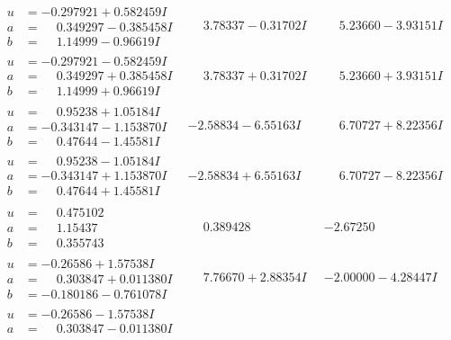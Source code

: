 \documentclass[1p]{elsarticle_modified}
\theoremstyle{definition}
\begin{document}
$$\begin{array}{c|c|c}
\begin{aligned}
u &= -0.297921 + 0.582459 I \\
a &= \phantom{-}0.349297 - 0.385458 I \\
b &= \phantom{-}1.14999 - 0.96619 I\end{aligned}
 & \phantom{-}3.78337 - 0.31702 I & \phantom{-}5.23660 - 3.93151 I \\ \hline\begin{aligned}
u &= -0.297921 - 0.582459 I \\
a &= \phantom{-}0.349297 + 0.385458 I \\
b &= \phantom{-}1.14999 + 0.96619 I\end{aligned}
 & \phantom{-}3.78337 + 0.31702 I & \phantom{-}5.23660 + 3.93151 I \\ \hline\begin{aligned}
u &= \phantom{-}0.95238 + 1.05184 I \\
a &= -0.343147 - 1.153870 I \\
b &= \phantom{-}0.47644 - 1.45581 I\end{aligned}
 & -2.58834 - 6.55163 I & \phantom{-}6.70727 + 8.22356 I \\ \hline\begin{aligned}
u &= \phantom{-}0.95238 - 1.05184 I \\
a &= -0.343147 + 1.153870 I \\
b &= \phantom{-}0.47644 + 1.45581 I\end{aligned}
 & -2.58834 + 6.55163 I & \phantom{-}6.70727 - 8.22356 I \\ \hline\begin{aligned}
u &= \phantom{-}0.475102\phantom{ +0.000000I} \\
a &= \phantom{-}1.15437\phantom{ +0.000000I} \\
b &= \phantom{-}0.355743\phantom{ +0.000000I}\end{aligned}
 & \phantom{-}0.389428\phantom{ +0.000000I} & -2.67250\phantom{ +0.000000I} \\ \hline\begin{aligned}
u &= -0.26586 + 1.57538 I \\
a &= \phantom{-}0.303847 + 0.011380 I \\
b &= -0.180186 - 0.761078 I\end{aligned}
 & \phantom{-}7.76670 + 2.88354 I & -2.00000 - 4.28447 I \\ \hline\begin{aligned}
u &= -0.26586 - 1.57538 I \\
a &= \phantom{-}0.303847 - 0.011380 I \\

\end{aligned}
\end{array}$$
\end{document}
